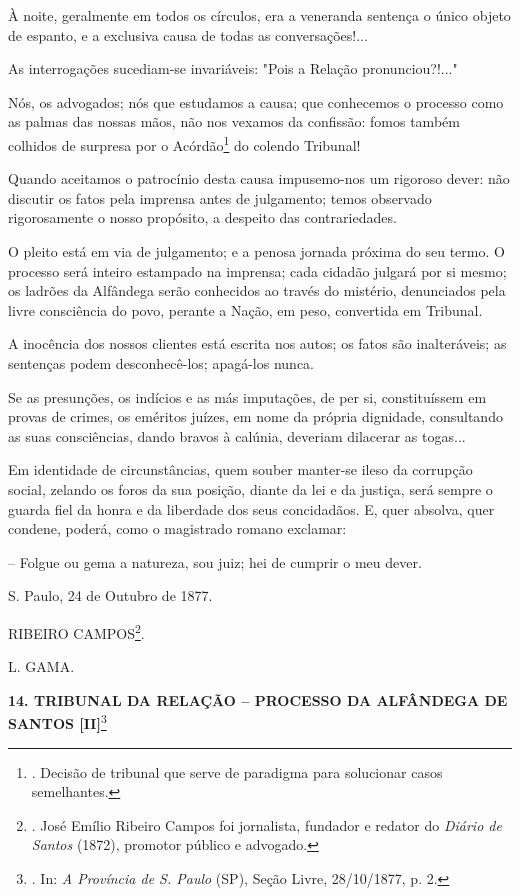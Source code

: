 À noite, geralmente em todos os círculos, era a veneranda sentença o
único objeto de espanto, e a exclusiva causa de todas as
conversações!...

As interrogações sucediam-se invariáveis: "Pois a Relação
pronunciou?!..."

Nós, os advogados; nós que estudamos a causa; que conhecemos o processo
como as palmas das nossas mãos, não nos vexamos da confissão: fomos
também colhidos de surpresa por o Acórdão\footnote{. Decisão de tribunal
  que serve de paradigma para solucionar casos semelhantes.} do colendo
Tribunal!

Quando aceitamos o patrocínio desta causa impusemo-nos um rigoroso
dever: não discutir os fatos pela imprensa antes de julgamento; temos
observado rigorosamente o nosso propósito, a despeito das
contrariedades.

O pleito está em via de julgamento; e a penosa jornada próxima do seu
termo. O processo será inteiro estampado na imprensa; cada cidadão
julgará por si mesmo; os ladrões da Alfândega serão conhecidos ao través
do mistério, denunciados pela livre consciência do povo, perante a
Nação, em peso, convertida em Tribunal.

A inocência dos nossos clientes está escrita nos autos; os fatos são
inalteráveis; as sentenças podem desconhecê-los; apagá-los nunca.

Se as presunções, os indícios e as más imputações, de per si,
constituíssem em provas de crimes, os eméritos juízes, em nome da
própria dignidade, consultando as suas consciências, dando bravos à
calúnia, deveriam dilacerar as togas...

Em identidade de circunstâncias, quem souber manter-se ileso da
corrupção social, zelando os foros da sua posição, diante da lei e da
justiça, será sempre o guarda fiel da honra e da liberdade dos seus
concidadãos. E, quer absolva, quer condene, poderá, como o magistrado
romano exclamar:

-- Folgue ou gema a natureza, sou juiz; hei de cumprir o meu dever.

S. Paulo, 24 de Outubro de 1877.

RIBEIRO CAMPOS\footnote{. José Emílio Ribeiro Campos foi jornalista,
  fundador e redator do \emph{Diário de Santos} (1872), promotor público
  e advogado.}.

\protect\hypertarget{Secao_Sem_Titulo-19}{}{}L. GAMA.

\textbf{14. TRIBUNAL DA RELAÇÃO -- PROCESSO DA ALFÂNDEGA DE SANTOS
{[}II{]}}\footnote{. In: \emph{A Província de S. Paulo} (SP), Seção
  Livre, 28/10/1877, p. 2.}


